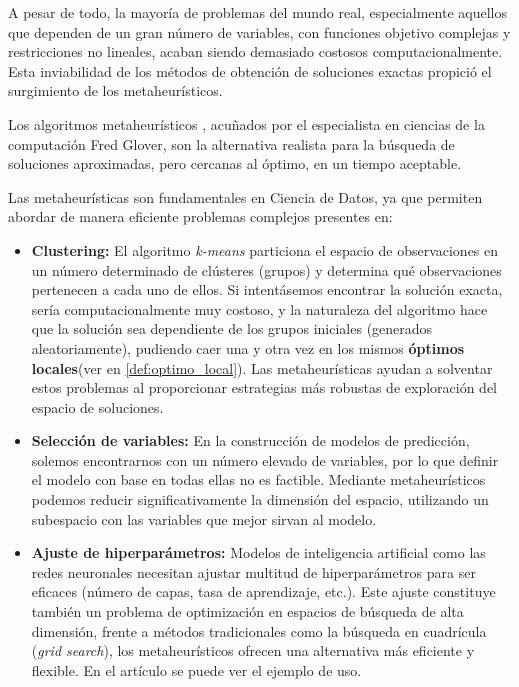 \documentclass[12pt,a4paper]{book}
\begin{document}
A pesar de todo, la mayoría de problemas del mundo real, especialmente aquellos que dependen de un gran número de variables, con funciones objetivo complejas y restricciones no lineales, acaban siendo demasiado costosos computacionalmente. Esta inviabilidad de los métodos de obtención de soluciones exactas propició el surgimiento de los metaheurísticos.

Los algoritmos metaheurísticos \citep{metaheuristicos}, acuñados por el especialista en ciencias de la computación Fred Glover,
son la alternativa realista para la búsqueda de soluciones aproximadas, pero cercanas al óptimo, en un tiempo aceptable.

Las metaheurísticas son fundamentales en Ciencia de Datos, ya que permiten abordar de manera eficiente problemas complejos presentes en:

\begin{itemize}
    \item \textbf{Clustering:} El algoritmo \textit{k-means} \citep{k-means} particiona el espacio de observaciones en un número determinado de clústeres (grupos) y determina qué observaciones pertenecen a cada uno de ellos. 
    Si intentásemos encontrar la solución exacta, sería computacionalmente muy costoso, y la naturaleza del algoritmo hace que la solución sea dependiente de los grupos iniciales (generados aleatoriamente), pudiendo caer una y otra vez en los mismos \textbf{óptimos locales}(ver en \ref{def:optimo_local}).
    Las metaheurísticas ayudan a solventar estos problemas al proporcionar estrategias más robustas de exploración del espacio de soluciones.
    
    \item \textbf{Selección de variables:} En la construcción de modelos de predicción, solemos encontrarnos con un número elevado de variables, por lo que definir el modelo con base en todas ellas no es factible. Mediante metaheurísticos podemos 
    reducir significativamente la dimensión del espacio, utilizando un subespacio con las variables que mejor sirvan al modelo.
    
    \item \textbf{Ajuste de hiperparámetros:} Modelos de inteligencia artificial como las redes neuronales necesitan ajustar multitud de hiperparámetros para ser eficaces (número de capas, tasa de aprendizaje, etc.). Este ajuste constituye también un problema de optimización en espacios de búsqueda de alta dimensión, frente a métodos tradicionales como la búsqueda en cuadrícula (\textit{grid search}), los metaheurísticos ofrecen una alternativa más eficiente y flexible. En el artículo \cite{hyperparameters} se puede ver el ejemplo de uso.
\end{itemize}
\end{document}
